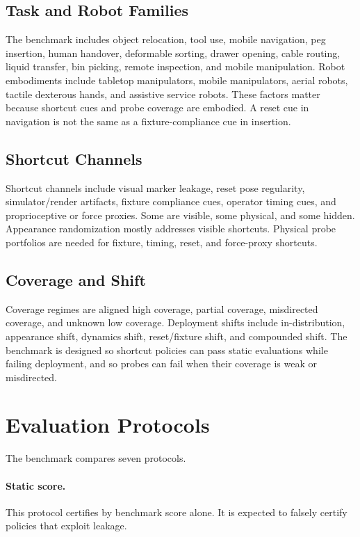 \documentclass{article}
\begin{document}
\subsection{Task and Robot Families}

The benchmark includes object relocation, tool use, mobile navigation, peg insertion, human handover, deformable sorting, drawer opening, cable routing, liquid transfer, bin picking, remote inspection, and mobile manipulation. Robot embodiments include tabletop manipulators, mobile manipulators, aerial robots, tactile dexterous hands, and assistive service robots. These factors matter because shortcut cues and probe coverage are embodied. A reset cue in navigation is not the same as a fixture-compliance cue in insertion.

\subsection{Shortcut Channels}

Shortcut channels include visual marker leakage, reset pose regularity, simulator/render artifacts, fixture compliance cues, operator timing cues, and proprioceptive or force proxies. Some are visible, some physical, and some hidden. Appearance randomization mostly addresses visible shortcuts. Physical probe portfolios are needed for fixture, timing, reset, and force-proxy shortcuts.

\subsection{Coverage and Shift}

Coverage regimes are aligned high coverage, partial coverage, misdirected coverage, and unknown low coverage. Deployment shifts include in-distribution, appearance shift, dynamics shift, reset/fixture shift, and compounded shift. The benchmark is designed so shortcut policies can pass static evaluations while failing deployment, and so probes can fail when their coverage is weak or misdirected.

\section{Evaluation Protocols}

The benchmark compares seven protocols.

\paragraph{Static score.}
This protocol certifies by benchmark score alone. It is expected to falsely certify policies that exploit leakage.
\end{document}
